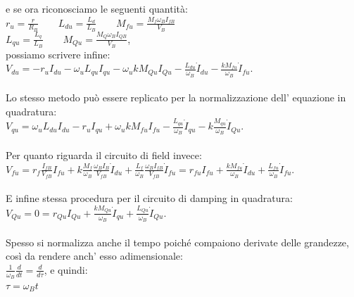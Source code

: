 \documentclass[Lau,noexaminfo]{sapthesis}
\begin{document}
	 e se ora riconosciamo le seguenti quantità:\\
	 $r_u=\frac{r}{R_B} \qquad L_{du}=\frac{L_d}{L_B} \qquad M_{fu}=\frac{M_f\omega_B I_{fB}}{V_B}$\\
	 $L_{qu}=\frac{L_q}{L_B} \qquad M_{Qu}=\frac{M_Q \omega_B I_{QB}}{V_B} $,\\
	 possiamo scrivere infine:\\
	 $V_{du}=-r_uI_{du}-\omega_u L_{qu} I_{qu} -\omega_ukM_{Qu} I_{Qu} -\frac{L_{du}}{\omega_B}\dot{I}_{du}-\frac{kM_{fu}}{\omega_B}\dot{I}_{fu}$.\\\\
	 Lo stesso metodo può essere replicato per la normalizzazione dell' equazione in quadratura:\\
	 $V_{qu}=\omega_u L_{du}I_{du}-r_u I_{qu}+\omega_ukM_{fu}I_{fu}-\frac{L_{qu}}{\omega_B}\dot{I}_{qu}-k\frac{M_{qu}}{\omega_B}\dot{I}_{Qu}$.\\\\
	 Per quanto riguarda il circuito di field invece:\\
	 $V_{fu}=r_f\frac{I_{fB}}{V_{fB}}I_{fu}+k\frac{M_f}{\omega_B}\frac{\omega_BI_B}{V_{fB}}\dot{I}_{du}+\frac{L_f}{\omega_B}\frac{\omega_BI_{fB}}{V_{fB}}\dot{I}_{fu}=r_{fu}I_{fu}+\frac{kM_{fu}}{\omega_B}\dot{I}_{du}+\frac{L_{fu}}{\omega_B}\dot{I}_{fu}$.\\\\
	 E infine stessa procedura per il circuito di damping in quadratura:\\
	 $V_{Qu}=0=r_{Qu}I_{Qu}+\frac{kM_{Qu}}{\omega_B}\dot{I}_{qu}+\frac{L_{Qu}}{\omega_B}\dot{I}_{Qu}$.\\\\
	 Spesso si normalizza anche il tempo poiché compaiono derivate delle grandezze, così da rendere anch' esso adimensionale:\\
	 $\frac{1}{\omega_B}\frac{d}{dt}=\frac{d}{d\tau}$, e quindi:\\
	 $\tau=\omega_Bt$
\end{document}
